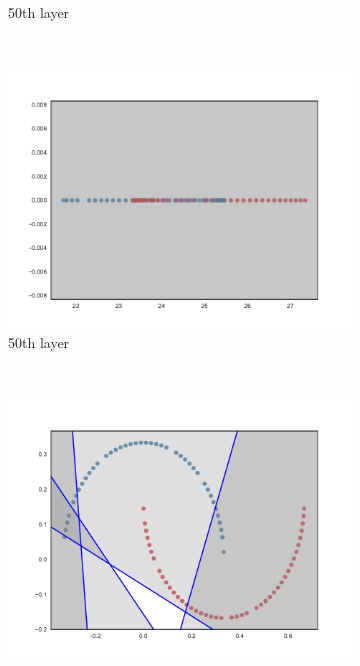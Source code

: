 \begin{figure}
\begin{subfigure}[b]{0.3\textwidth}
        \caption{\SepLayer 50th layer}
        \label{fig:layerwiseInit501}
    \end{subfigure}
    ~ %
    \begin{subfigure}[b]{0.3\textwidth}
        \includegraphics[width=\textwidth]{img/init/layerwise/conv2d_50-2.pdf}
        \caption{\SepLayer 50th layer}
        \label{fig:layerwiseInit502}
    \end{subfigure}
    \\
    \begin{subfigure}[b]{0.3\textwidth}
        \includegraphics[width=\textwidth]{img/init/unitpointwise/conv2d_1-0.pdf}

\end{subfigure}
\end{figure}
